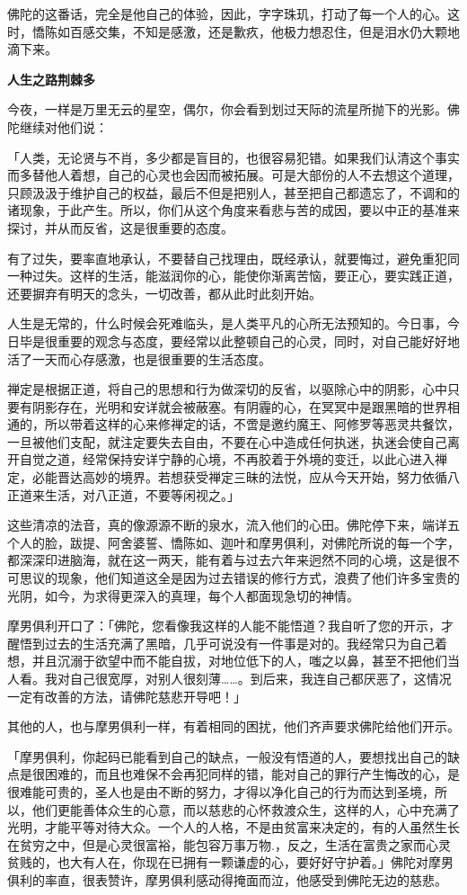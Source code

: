 \documentclass[twoside,openany]{book}
\newcommand{\mt}[1]{\textbullet \textbf{#1}}
\begin{document}
佛陀的这番话，完全是他自己的体验，因此，字字珠玑，打动了每一个人的心。这时，憍陈如百感交集，不知是感激，还是歉疚，他极力想忍住，但是泪水仍大颗地滴下来。

\mt{人生之路荆棘多}

今夜，一样是万里无云的星空，偶尔，你会看到划过天际的流星所抛下的光影。佛陀继续对他们说：

「人类，无论贤与不肖，多少都是盲目的，也很容易犯错。如果我们认清这个事实而多替他人着想，自己的心灵也会因而被拓展。可是大部份的人不去想这个道理，只顾汲汲于维护自己的权益，最后不但是把别人，甚至把自己都遗忘了，不调和的诸现象，于此产生。所以，你们从这个角度来看悲与苦的成因，要以中正的基准来探讨，并从而反省，这是很重要的态度。

有了过失，要率直地承认，不要替自己找理由，既经承认，就要悔过，避免重犯同一种过失。这样的生活，能滋润你的心，能使你渐离苦恼，要正心，要实践正道，还要摒弃有明天的念头，一切改善，都从此时此刻开始。

人生是无常的，什么时候会死难临头，是人类平凡的心所无法预知的。今日事，今日毕是很重要的观念与态度，要经常以此整顿自己的心灵，同时，对自己能好好地活了一天而心存感激，也是很重要的生活态度。

禅定是根据正道，将自己的思想和行为做深切的反省，以驱除心中的阴影，心中只要有阴影存在，光明和安详就会被蔽塞。有阴霾的心，在冥冥中是跟黑暗的世界相通的，所以带着这样的心来修禅定的话，不啻是邀约魔王、阿修罗等恶灵共餐饮，一旦被他们支配，就注定要失去自由，不要在心中造成任何执迷，执迷会使自己离开自觉之道，经常保持安详宁静的心境，不再胶着于外境的变迁，以此心进入禅定，必能晋达高妙的境界。若想获受禅定三昧的法悦，应从今天开始，努力依循八正道来生活，对八正道，不要等闲视之。」

这些清凉的法音，真的像源源不断的泉水，流入他们的心田。佛陀停下来，端详五个人的脸，跋提、阿舍婆誓、憍陈如、迦叶和摩男俱利，对佛陀所说的每一个字，都深深印进脑海，就在这一两天，能有着与过去六年来迥然不同的心境，这是很不可思议的现象，他们知道这全是因为过去错误的修行方式，浪费了他们许多宝贵的光阴，如今，为求得更深入的真理，每个人都面现急切的神情。

摩男俱利开口了：「佛陀，您看像我这样的人能不能悟道？我自听了您的开示，才醒悟到过去的生活充满了黑暗，几乎可说没有一件事是对的。我经常只为自己着想，并且沉溺于欲望中而不能自拔，对地位低下的人，嗤之以鼻，甚至不把他们当人看。我对自己很宽厚，对别人很刻薄……。到后来，我连自己都厌恶了，这情况一定有改善的方法，请佛陀慈悲开导吧！」

其他的人，也与摩男俱利一样，有着相同的困扰，他们齐声要求佛陀给他们开示。

「摩男俱利，你起码已能看到自己的缺点，一般没有悟道的人，要想找出自己的缺点是很困难的，而且也难保不会再犯同样的错，能对自己的罪行产生悔改的心，是很难能可贵的，圣人也是由不断的努力，才得以净化自己的行为而达到圣境，所以，他们更能善体众生的心意，而以慈悲的心怀救渡众生，这样的人，心中充满了光明，才能平等对待大众。一个人的人格，不是由贫富来决定的，有的人虽然生长在贫穷之中，但是心灵很富裕，能包容万事万物.，反之，生活在富贵之家而心灵贫贱的，也大有人在，你现在已拥有一颗谦虚的心，要好好守护着。」佛陀对摩男俱利的率直，很表赞许，摩男俱利感动得掩面而泣，他感受到佛陀无边的慈悲。
\end{document}
